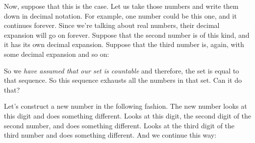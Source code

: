 \documentclass[pdftex, brazil, 12pt, twoside]{article}
\begin{document}
\begin{figure}[H]
  \begin{center}
  \end{center}
\end{figure}

Now, suppose that this is the case.
Let us take those numbers and write them
down in decimal notation.
For example, one number could be this one, and
it continues forever.
Since we're talking about real numbers, their decimal
expansion will go on forever.
Suppose that the second number is of this kind, and it has
its own decimal expansion.
Suppose that the third number is, again, with some decimal
expansion and so on:

\begin{figure}[H]
  \begin{center}
  \end{center}
\end{figure}

So we \emph{have assumed that our set is countable} and
therefore, the set is equal to that sequence.
So this sequence exhausts all the numbers in that set.
Can it do that?

Let's construct a new number in the following fashion.
The new number looks at this digit and
does something different.
Looks at this digit, the second digit of the second
number, and does something different.
Looks at the third digit of the third number and does
something different.
And we continue this way:

\begin{figure}[H]
  \begin{center}
  \end{center}
\end{figure}
\end{document}
